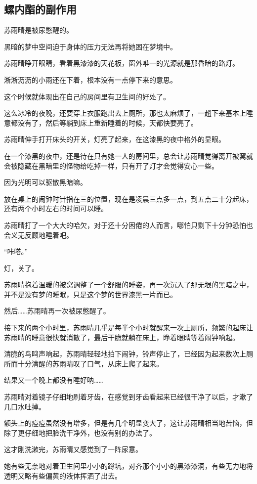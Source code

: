 \subsection{螺内酯的副作用}

苏雨晴是被尿憋醒的。

黑暗的梦中空间迫于身体的压力无法再将她困在梦境中。

苏雨晴睁开眼睛，看着黑漆漆的天花板，窗外唯一的光源就是那昏暗的路灯。

淅淅沥沥的小雨还在下着，根本没有一点停下来的意思。

这个时候就体现出在自己的房间里有卫生间的好处了。

这么冰冷的夜晚，还要穿上衣服跑出去上厕所，那也太麻烦了，一趟下来基本上睡意都没有了，然后等躺到床上重新睡着的时候，天都快要亮了。

苏雨晴伸手打开床头的开关，灯亮了起来，在这漆黑的夜中格外的显眼。

在一个漆黑的夜中，还是待在只有她一人的房间里，总会让苏雨晴觉得离开被窝就会被隐藏在黑暗里的怪物给吃掉一样，只有开了灯才会觉得安心一些。

因为光明可以驱散黑暗嘛。

放在桌上的闹钟时针指在三的位置，现在是凌晨三点多一点，到五点二十分起床，还有两个小时左右的时间可以睡。

苏雨晴打了一个大大的哈欠，对于还十分困倦的人而言，哪怕只剩下十分钟恐怕也会义无反顾地睡着吧。

“咔嗒。”

灯，关了。

苏雨晴抱着温暖的被窝调整了一个舒服的睡姿，再一次沉入了那无垠的黑暗之中，并不是没有梦的睡眠，只是这个梦的世界漆黑一片而已。

然后……苏雨晴再一次被尿憋醒了。

接下来的两个小时里，苏雨晴几乎是每半个小时就醒来一次上厕所，频繁的起床让苏雨晴的睡意很快就消散了，最后干脆就躺在床上，睁着眼睛等着闹钟响起。

清脆的鸟鸣声响起，苏雨晴轻轻地拍下闹钟，铃声停止了，已经因为起来数次上厕所而十分清醒的苏雨晴叹了口气，从床上爬了起来。

结果又一个晚上都没有睡好呐……

苏雨晴对着镜子仔细地刷着牙齿，在感觉到牙齿看起来已经很干净了以后，才漱了几口水吐掉。

额头上的痘痘虽然没有增多，但是有几个明显变大了，这让苏雨晴相当地苦恼，但除了更仔细地把脸洗干净外，也没有别的办法了。

这才刚洗漱完，苏雨晴又感觉到了一阵尿意。

她有些无奈地对着卫生间里小小的蹲坑，对齐那个小小的黑漆漆洞，有些无力地将透明又略有些偏黄的液体挥洒了出去。

